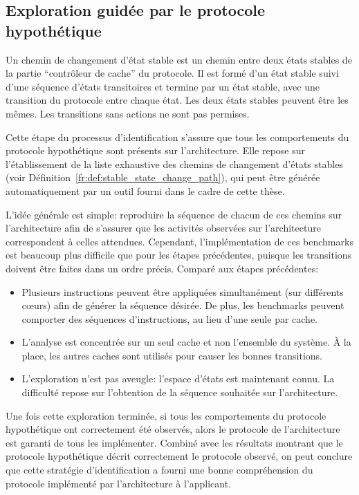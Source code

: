 \subsection{Exploration guidée par le protocole hypothétique}
\begin{definition}
\label{fr:def:stable_state_change_path}
Un chemin de changement d'état stable est un chemin entre deux états stables
de la partie ``contrôleur de cache'' du protocole. Il est formé d'un état stable
suivi d'une séquence d'états transitoires et termine par un état stable, avec
une transition du protocole entre chaque état. Les deux états stables
peuvent être les mêmes. Les transitions sans actions ne sont pas permises.
\end{definition}

Cette étape du processus d'identification s'assure que tous les comportements
du protocole hypothétique sont présents sur l'architecture. Elle repose sur
l'établissement de la liste exhaustive des chemins de changement d'états stables
(voir Définition~\ref{fr:def:stable_state_change_path}), qui peut être générée
automatiquement par un outil fourni dans le cadre de cette thèse.


L'idée générale est simple: reproduire la séquence de chacun de ces chemins sur
l'architecture afin de s'assurer que les activités observées sur l'architecture
correspondent à celles attendues. Cependant, l'implémentation de ces benchmarks
est beaucoup plus difficile que pour les étapes précédentes, puisque les
transitions doivent être faites dans un ordre précis. Comparé aux étapes
précédentes:
\begin{itemize}
    \setlength{\itemsep}{0pt}%
   \setlength{\parskip}{0pt}%
\item Plusieurs instructions peuvent être appliquées simultanément
  (sur différents cœurs) afin de générer la séquence désirée. De
  plus, les benchmarks peuvent comporter des séquences d'instructions,
  au lieu d'une seule par cache.
\item
   L'analyse est concentrée sur un seul cache et non l'ensemble du système. À la
   place, les autres caches sont utilisés pour causer les bonnes transitions.
 \item L'exploration n'est pas aveugle: l'espace d'états est
   maintenant connu. La difficulté repose sur l'obtention de
   la séquence souhaitée sur l'architecture.
\end{itemize}

Une fois cette exploration terminée, si tous les comportements du protocole
hypothétique ont correctement été observés, alors le protocole de
l'architecture est garanti de tous les implémenter. Combiné avec les résultats
montrant que le protocole hypothétique décrit correctement le protocole
observé, on peut conclure que cette stratégie d'identification a fourni une
bonne compréhension du protocole implémenté par l'architecture à l'applicant.

